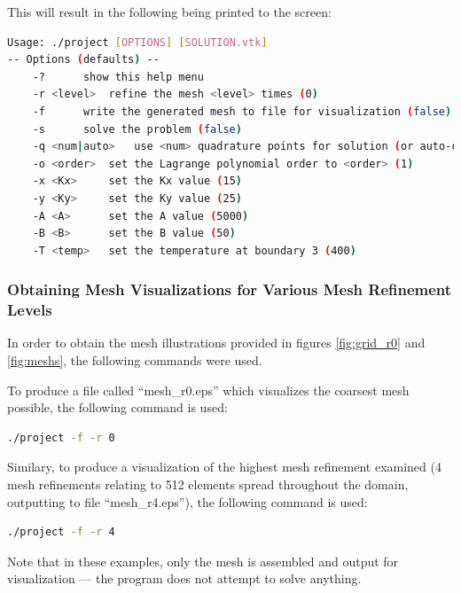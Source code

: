 \documentclass[letterpaper,10pt]{article}
\begin{document}
This will result in the following being printed to the screen:
\vspace{-6mm}
\begin{lstlisting}[numbers=none,frame=none,language=bash,keywordstyle=none]
Usage: ./project [OPTIONS] [SOLUTION.vtk]
-- Options (defaults) --
	-?		show this help menu
	-r <level>	refine the mesh <level> times (0)
	-f		write the generated mesh to file for visualization (false)
	-s		solve the problem (false)
	-q <num|auto>	use <num> quadrature points for solution (or auto-calculate based on order) (auto)
	-o <order>	set the Lagrange polynomial order to <order> (1)
	-x <Kx>		set the Kx value (15)
	-y <Ky>		set the Ky value (25)
	-A <A>		set the A value (5000)
	-B <B>		set the B value (50)
	-T <temp>	set the temperature at boundary 3 (400)
\end{lstlisting}
\vspace{1mm}

\subsubsection{Obtaining Mesh Visualizations for Various Mesh Refinement Levels}
In order to obtain the mesh illustrations provided in figures \ref{fig:grid_r0} and \ref{fig:meshs}, the following commands were used.

To produce a file called ``mesh\_r0.eps'' which visualizes the coarsest mesh possible, the following command is used:
\vspace{-6mm}
\begin{lstlisting}[numbers=none,frame=none,language=bash]
./project -f -r 0
\end{lstlisting}
\vspace{1mm}

Similary, to produce a visualization of the highest mesh refinement examined (4 mesh refinements relating to 512 elements spread throughout the domain, outputting to file ``mesh\_r4.eps''), the following command is used:
\vspace{-6mm}
\begin{lstlisting}[numbers=none,frame=none,language=bash]
./project -f -r 4
\end{lstlisting}
\vspace{1mm}

Note that in these examples, only the mesh is assembled and output for visualization --- the program does not attempt to solve anything.
\end{document}

